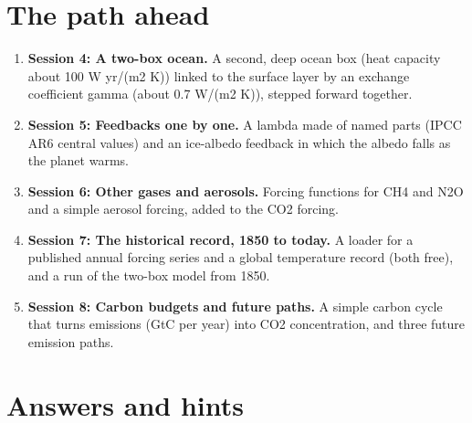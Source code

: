 \documentclass[11pt,a4paper]{article}
\begin{document}
\section{The path ahead}
\begin{enumerate}[nosep]
\item \textbf{Session 4: A two-box ocean.} A second, deep ocean box (heat capacity about 100 W yr/(m2 K)) linked to the surface layer by an exchange coefficient gamma (about 0.7 W/(m2 K)), stepped forward together.
\item \textbf{Session 5: Feedbacks one by one.} A lambda made of named parts (IPCC AR6 central values) and an ice-albedo feedback in which the albedo falls as the planet warms.
\item \textbf{Session 6: Other gases and aerosols.} Forcing functions for CH4 and N2O and a simple aerosol forcing, added to the CO2 forcing.
\item \textbf{Session 7: The historical record, 1850 to today.} A loader for a published annual forcing series and a global temperature record (both free), and a run of the two-box model from 1850.
\item \textbf{Session 8: Carbon budgets and future paths.} A simple carbon cycle that turns emissions (GtC per year) into CO2 concentration, and three future emission paths.
\end{enumerate}

\section{Answers and hints}
\end{document}
